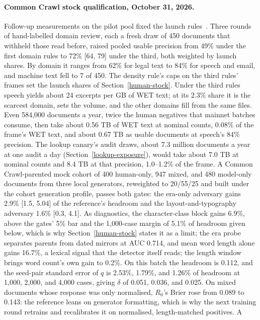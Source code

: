 \paragraph{Common Crawl stock qualification, October 31, 2026.}\label{cc-stock-evidence}
Follow-up measurements on the pilot pool fixed the launch rules~\cite{ccpilot}.
Three rounds of hand-labelled domain review, each a fresh draw of 450 documents
that withheld those read before, raised pooled usable precision from 49\% under
the first domain rules to 72\% [64, 79] under the third, both weighted by launch
shares. By
domain it ranges from 62\% for legal text to 84\% for speech and email, and
machine text fell to 7 of 450. The density rule's caps on the third rules'
frames set the launch shares of Section~\ref{human-stock}. Under the third
rules speech yields about 24 excerpts per GB of WET text; at its 2.3\% share it
is the scarcest domain, sets the volume, and the other domains fill from the
same files. Even 584,000 documents a year, twice the human negatives that
mainnet batches consume, then take about 0.56 TB of WET text at nominal counts,
0.08\% of the frame's WET text, and about 0.67 TB as usable documents at
speech's 84\% precision. The lookup canary's audit draws, about 7.3 million documents a year
at one audit a day (Section~\ref{lookup-exposure}), would take about 7.0 TB at
nominal counts and 8.4 TB at that precision, 1.0--1.2\% of the frame. A Common
Crawl-parented mock cohort of 400 human-only, 947 mixed, and 480
model-only documents from three local generators, reweighted to 20/55/25 and
built under the cohort generation profile, passes both gates: the era-only
adversary gains 2.9\% [1.5, 5.04] of the reference's headroom and the
layout-and-typography adversary 1.6\% [0.3, 4.1]. As diagnostics, the
character-class block gains 6.9\%, above the gates' 5\% bar and the 1,000-case
margin of 5.1\% of headroom given below, which is why Section~\ref{human-stock}
states it as a limit; the era probe separates parents from dated
mirrors at AUC 0.714, and mean word length alone gains 16.7\%, a lexical signal
that the detector itself reads; the length window brings word count's own gain
to 0.2\%. On this batch the headroom is 0.112, and the seed-pair standard error
of \(q\) is 2.53\%, 1.79\%, and 1.26\% of headroom at 1,000, 2,000, and 4,000
cases, giving \(\delta\) of 0.051, 0.036, and 0.025. On mixed documents whose
response was only normalised, \(R_0\)'s Brier rose from 0.089 to 0.143: the
reference leans on generator formatting, which is why the next training round
retrains and recalibrates it on normalised, length-matched positives. A
